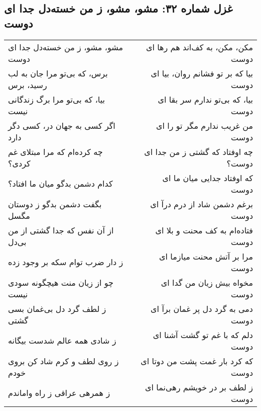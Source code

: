 \begin{center}
\section*{غزل شماره ۳۲: مشو، مشو، ز من خسته‌دل جدا ای دوست}
\label{sec:032}
\begin{longtable}{l p{0.5cm} r}
مشو، مشو، ز من خسته‌دل جدا ای دوست
&&
مکن، مکن، به کف‌اند هم رها ای دوست
\\
برس، که بی‌تو مرا جان به لب رسید، برس
&&
بیا که بر تو فشانم روان، بیا ای دوست
\\
بیا، که بی‌تو مرا برگ زندگانی نیست
&&
بیا، که بی‌تو ندارم سر بقا ای دوست
\\
اگر کسی به جهان در، کسی دگر دارد
&&
من غریب ندارم مگر تو را ای دوست
\\
چه کرده‌ام که مرا مبتلای غم کردی؟
&&
چه اوفتاد که گشتی ز من جدا ای دوست؟
\\
کدام دشمن بدگو میان ما افتاد؟
&&
که اوفتاد جدایی میان ما ای دوست
\\
بگفت دشمن بدگو ز دوستان مگسل
&&
برغم دشمن شاد از درم درآ ای دوست
\\
از آن نفس که جدا گشتی از من بی‌دل
&&
فتاده‌ام به کف محنت و بلا ای دوست
\\
ز دار ضرب توام سکه بر وجود زده
&&
مرا بر آتش محنت میازما ای دوست
\\
چو از زیان منت هیچگونه سودی نیست
&&
مخواه بیش زیان من گدا ای دوست
\\
ز لطف گرد دل بی‌غمان بسی گشتی
&&
دمی به گرد دل پر غمان برآ ای دوست
\\
ز شادی همه عالم شدست بیگانه
&&
دلم که با غم تو گشت آشنا ای دوست
\\
ز روی لطف و کرم شاد کن بروی خودم
&&
که کرد بار غمت پشت من دوتا ای دوست
\\
ز همرهی عراقی ز راه واماندم
&&
ز لطف بر در خویشم رهی‌نما ای دوست
\\
\end{longtable}
\end{center}
